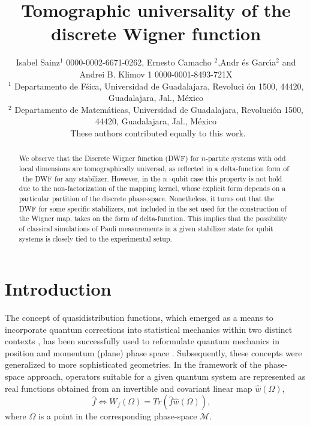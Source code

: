 \documentclass{article}
\begin{document}
\title{Tomographic universality of the discrete Wigner function}

\begin{abstract}
We observe that the Discrete Wigner function (DWF) for $n$-partite systems
with odd local dimensions are tomographically universal, as reflected in a
delta-function form of \ the DWF for any stabilizer. However, in the $n$%
-qubit case this property is not hold due to the non-factorization of the
mapping kernel, whose explicit form depends on a particular partition of the
discrete phase-space. Nonetheless, it turns out that the DWF for some
specific stabilizers, not included in the set used for the construction of
the Wigner map, takes on the form of delta-function. This implies that the
possibility of classical simulations of Pauli measurements in a given
stabilizer state for qubit systems is closely tied to the experimental setup.
\end{abstract}

\author{Isabel Sainz$^{1}$ 0000-0002-6671-0262, Ernesto Camacho $^{2}$,Andr%
\'{e}s Garc\'{\i}a$^{2}$ and Andrei B. Klimov 1 0000-0001-8493-721X \\
$^{1}$ \quad Departamento de F\'sica, Universidad de Guadalajara, Revoluci%
\'{o}n 1500, 44420, Guadalajara, Jal., M\'{e}xico\\
$^{2}$ \quad Departamento de Matem\'{a}ticas, Universidad de Guadalajara,
Revoluci\'{o}n 1500, 44420, Guadalajara, Jal., M\'{e}xico\\
\ddag\ These authors contributed equally to this work.}
\maketitle

\section{Introduction}

The concept of quasidistribution functions, which emerged as a means to
incorporate quantum corrections into statistical mechanics within two
distinct contexts \cite{wigner,bloch}, has been successfully used to
reformulate quantum mechanics in position and momentum (plane) phase space 
\cite{groenewold,moyal}. Subsequently, these concepts were generalized to
more sophisticated geometries. In the framework of the phase-space approach,
operators suitable for a given quantum system are represented as real
functions obtained from an invertible and covariant linear map $\hat{w}%
(\Omega )$,%
\begin{equation*}
\hat{f}\Leftrightarrow W_{f}(\Omega )=Tr\left( \hat{f}\hat{w}(\Omega
)\right) ,\quad
\end{equation*}%
where $\Omega $ is a point in the corresponding phase-space $\mathcal{M}$.
\end{document}
